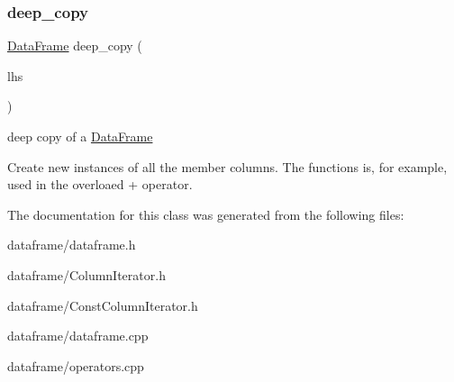 \subsubsection{\texorpdfstring{deep\+\_\+copy}{deep\_copy}}
{\footnotesize\ttfamily \hyperlink{classDataFrame}{Data\+Frame} deep\+\_\+copy (\begin{DoxyParamCaption}\item[{const \hyperlink{classDataFrame}{Data\+Frame} \&}]{lhs }\end{DoxyParamCaption})\hspace{0.3cm}{\ttfamily [friend]}}



deep copy of a \hyperlink{classDataFrame}{Data\+Frame} 

Create new instances of all the member columns. The functions is, for example, used in the overloaed + operator. 

The documentation for this class was generated from the following files\+:\begin{DoxyCompactItemize}
\item 
dataframe/dataframe.\+h\item 
dataframe/Column\+Iterator.\+h\item 
dataframe/Const\+Column\+Iterator.\+h\item 
dataframe/dataframe.\+cpp\item 
dataframe/operators.\+cpp\end{DoxyCompactItemize}
